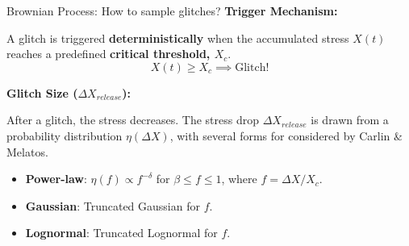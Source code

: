 \begin{frame}{Brownian Process: How to sample glitches?}
    \textbf{Trigger Mechanism:}
    
    A glitch is triggered \textbf{deterministically} when the accumulated stress $X(t)$ reaches a predefined \textbf{critical threshold, $X_c$}.
    $$X(t) \geq X_c \implies \text{Glitch!}$$
    
    \textbf{Glitch Size ($\Delta X_{release}$):}

    After a glitch, the stress decreases.
    The stress drop $\Delta X_{release}$ is drawn from a probability distribution $\eta(\Delta X)$, with several forms for considered by Carlin \& Melatos.
        \begin{itemize}
            \item \textbf{Power-law}: $\eta(f) \propto f^{-\delta}$ for $\beta \le f \le 1$, where $f = \Delta X / X_c$.
            \item \textbf{Gaussian}: Truncated Gaussian for $f$.
            \item \textbf{Lognormal}: Truncated Lognormal for $f$.
        \end{itemize}
    
\end{frame}

